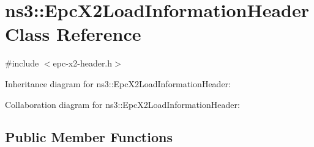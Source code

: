 \hypertarget{classns3_1_1EpcX2LoadInformationHeader}{}\section{ns3\+:\+:Epc\+X2\+Load\+Information\+Header Class Reference}
\label{classns3_1_1EpcX2LoadInformationHeader}


{\ttfamily \#include $<$epc-\/x2-\/header.\+h$>$}



Inheritance diagram for ns3\+:\+:Epc\+X2\+Load\+Information\+Header\+:


Collaboration diagram for ns3\+:\+:Epc\+X2\+Load\+Information\+Header\+:
\subsection*{Public Member Functions}
